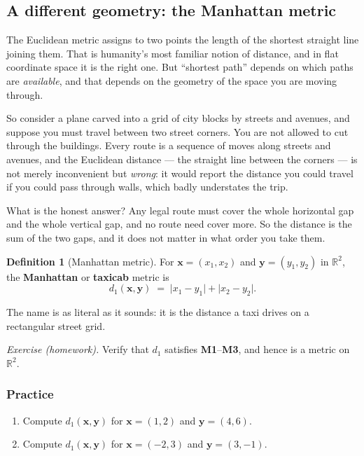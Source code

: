 \documentclass[11pt]{article}
\theoremstyle{definition}
\newtheorem{defn}{Definition}
\theoremstyle{remark}
\newcommand{\R}{\mathbb{R}}
\newcommand{\vc}[1]{\mathbf{#1}}
\begin{document}
\subsection{A different geometry: the Manhattan metric}
The Euclidean metric assigns to two points the length of the shortest straight
line joining them. That is humanity's most familiar notion of distance, and in
flat coordinate space it is the right one. But ``shortest path'' depends on which
paths are \emph{available}, and that depends on the geometry of the space you are
moving through.

So consider a plane carved into a grid of city blocks by streets and avenues,
and suppose you must travel between two street corners. You are not allowed to
cut through the buildings. Every route is a sequence of moves along streets and
avenues, and the Euclidean distance --- the straight line between the corners
--- is not merely inconvenient but \emph{wrong}: it would report the distance
you could travel if you could pass through walls, which badly understates the
trip.

What is the honest answer? Any legal route must cover the whole horizontal gap
and the whole vertical gap, and no route need cover more. So the distance is the
sum of the two gaps, and it does not matter in what order you take them.

\begin{defn}[Manhattan metric]
For $\vc{x}=(x_1,x_2)$ and $\vc{y}=(y_1,y_2)$ in $\R^{2}$, the
\textbf{Manhattan} or \textbf{taxicab} metric is
\[
  d_1(\vc{x},\vc{y}) \;=\; \lvert x_1-y_1\rvert + \lvert x_2-y_2\rvert .
\]
\end{defn}

\noindent The name is as literal as it sounds: it is the distance a taxi drives
on a rectangular street grid.

\smallskip
\noindent\emph{Exercise (homework).} Verify that $d_1$ satisfies
\textbf{M1}--\textbf{M3}, and hence is a metric on $\R^{2}$.

\subsubsection*{Practice}
\begin{enumerate}[label=\textbf{P\arabic*.},leftmargin=2.8em,itemsep=5pt,
                  topsep=5pt]
  \item Compute $d_1(\vc{x},\vc{y})$ for $\vc{x}=(1,2)$ and $\vc{y}=(4,6)$.
  \item Compute $d_1(\vc{x},\vc{y})$ for $\vc{x}=(-2,3)$ and $\vc{y}=(3,-1)$.
\end{enumerate}
\end{document}
